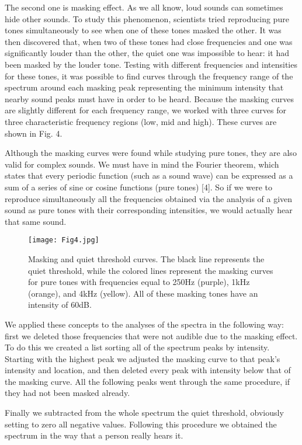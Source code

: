 \documentclass[twocolumn]{revtex4}
\begin{document}
The second one is masking effect. As we all know, loud sounds can sometimes hide other sounds. To study this phenomenon, scientists tried reproducing pure tones simultaneously to see when one of these tones masked the other. It was then discovered that, when two of these tones had close frequencies and one was significantly louder than the other, the quiet one was impossible to hear: it had been masked by the louder tone. Testing with different frequencies and intensities for these tones, it was possible to find curves through the frequency range of the spectrum around each masking peak representing the minimum intensity that nearby sound peaks must have in order to be heard. Because the masking curves are slightly different for each frequency range, we worked with three curves for three characteristic frequency regions (low, mid and high). These curves are shown in Fig. 4. 

Although the masking curves were found while studying pure tones, they are also valid for complex sounds. We must have in mind the Fourier theorem, which states that every periodic function (such as a sound wave) can be expressed as a sum of a series of sine or cosine functions (pure tones) [4]. So if we were to reproduce simultaneously all the frequencies obtained via the analysis of a given sound as pure tones with their corresponding intensities, we would actually hear that same sound.

\begin{figure}[h!]
\centering
\texttt{[image: Fig4.jpg]}
\caption{Masking and quiet threshold curves. The black line represents the quiet threshold, while the colored lines represent the masking curves for pure tones with frequencies equal to 250Hz (purple), 1kHz (orange), and 4kHz (yellow). All of these masking tones have an intensity of 60dB.}
\end{figure}

We applied these concepts to the analyses of the spectra in the following way: first we deleted those frequencies that were not audible due to the masking effect. To do this we created a list sorting all of the spectrum peaks by intensity. Starting with the highest peak we adjusted the masking curve to that peak's intensity and location, and then deleted every peak with intensity below that of the masking curve. All the following peaks went through the same procedure, if they had not been masked already.

Finally we subtracted from the whole spectrum the quiet threshold, obviously setting to zero all negative values. Following this procedure we obtained the spectrum in the way that a person really hears it.
\end{document}
